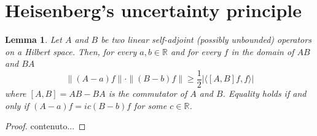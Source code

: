 \documentclass[corpo=11pt, stile=classica, tipotesi=custom,
greek, evenboxes, english]{toptesi}
\numberwithin{equation}{chapter}
\newtheorem{lem}[teo]{Lemma}
\newcommand{\R}{\mathbb{R}} %
\begin{document}
\section{Heisenberg's uncertainty principle}\label{section Heisenberg's UP}
\begin{lem}\label{uncertainty principle for operators lemma}
	Let $A$ and $B$ be two linear self-adjoint (possibly unbounded) operators on a Hilbert space. Then, for every $a,b \in \R$ and for every $f$ in the domain of $AB$ and $BA$
	\begin{equation}\label{uncertainty principle for operators formula}
		\| (A-a)f \| \cdot \| (B-b) f\| \geq \dfrac12\lvert\langle [A,B]f,f \rangle \rvert
	\end{equation}
	where $[A,B] = AB-BA$ is the commutator of $A$ and $B$. Equality holds if and only if $(A-a)f = i c(B-b)f$ for some $c \in \R$.
\end{lem}
\begin{proof}
	contenuto...
\end{proof}
\end{document}
